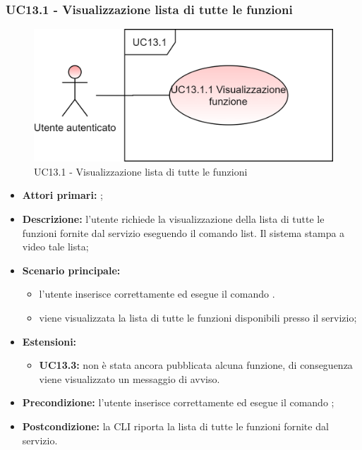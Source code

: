 \subsubsection{UC13.1 -  Visualizzazione lista di tutte le funzioni}
\begin{figure}[H]
	\centering
	\includegraphics[scale=\ucs]{./res/img/UC13.1.png}
	\caption {UC13.1 -  Visualizzazione lista di tutte le funzioni}
\end{figure}
\begin{itemize}
	\item \textbf{Attori primari:} \ua{};
	\item \textbf{Descrizione:} l’utente richiede la visualizzazione della lista di tutte le funzioni fornite dal servizio eseguendo il comando list. Il sistema stampa a video tale lista; 
	\item \textbf{Scenario principale:} 
	\begin{itemize}
		\item l'utente inserisce correttamente ed esegue il comando \lista{}. 
		\item viene visualizzata la lista di tutte le funzioni disponibili presso il servizio;
	\end{itemize}
	\item \textbf{Estensioni:} 
	\begin{itemize}
		\item \textbf{UC13.3:} non è stata ancora pubblicata alcuna funzione, di conseguenza viene visualizzato un messaggio di avviso. 
	\end{itemize}
	\item \textbf{Precondizione:} l'utente inserisce correttamente ed esegue il comando \lista{};
	\item \textbf{Postcondizione:} la CLI riporta la lista di tutte le funzioni fornite dal servizio.
\end{itemize}